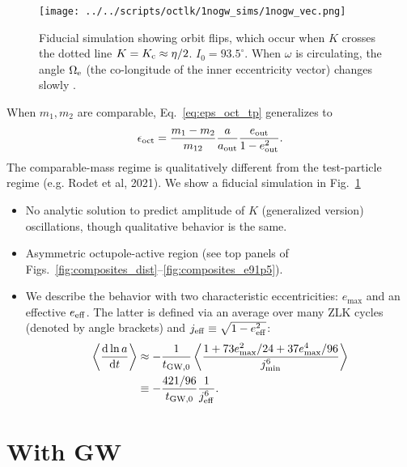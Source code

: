 \documentclass[
        fleqn,
        usenatbib,
    ]{mnras}
\newcommand*{\rd}[2]{\frac{\mathrm{d}#1}{\mathrm{d}#2}}
\newcommand*{\ev}[1]{\left\langle#1\right\rangle}
\newlength{\colummwidth}
\begin{document}
\begin{figure}
    \centering
    \texttt{[image: ../../scripts/octlk/1nogw\_sims/1nogw\_vec.png]}
    \caption{Fiducial simulation showing orbit flips, which occur when $K$
    crosses the dotted line $K = K_{\rm c} \approx \eta / 2$. $I_0 =
    93.5^\circ$. When $\omega$ is circulating, the angle $\Omega_{\rm e}$ (the
    co-longitude of the inner eccentricity vector) changes slowly
    \citep{katz2011long}. }\label{fig:nogw_fiducial}
\end{figure}
When $m_1, m_2$ are comparable, Eq.~\eqref{eq:eps_oct_tp} generalizes to
\begin{equation}
    \epsilon_{\rm oct} = \frac{m_1 - m_2}{m_{12}} \frac{a}{a_{\rm out}}
        \frac{e_{\rm out}}{1 - e_{\rm out}^2}.\label{eq:eps_oct}
\end{equation}
The comparable-mass regime is qualitatively different from the test-particle
regime (e.g. Rodet et al, 2021). We show a fiducial simulation in
Fig.~\ref{fig:nogw_fiducial}

\begin{itemize}
    \item No analytic solution to predict amplitude of $K$ (generalized version)
        oscillations, though qualitative behavior is the same.

    \item Asymmetric octupole-active region (see top panels of
        Figs.~\ref{fig:composites_dist}--\ref{fig:composites_e91p5}).

    \item We describe the behavior with two characteristic eccentricities:
        $e_{\max}$ and an effective $e_{\rm eff}$. The latter is defined via an
        average over many ZLK cycles (denoted by angle brackets) and $j_{\rm
        eff} \equiv \sqrt{1 - e_{\rm eff}^2}$:
        \begin{align}
            \ev{\rd{\ln a}{t}} &\approx -\frac{1}{t_{\rm GW, 0}}
                    \ev{\frac{1 + 73e_{\max}^2/24 + 37e_{\max}^4/96}
                        {j_{\min}^6}}\nonumber\\
                &\equiv -\frac{421/96}{t_{\rm GW, 0}}\frac{1}{j_{\rm eff}^6}.
                \label{eq:def_e_eff}
        \end{align}
\end{itemize}

\section{With GW}\label{s:with_gw}
\end{document}

